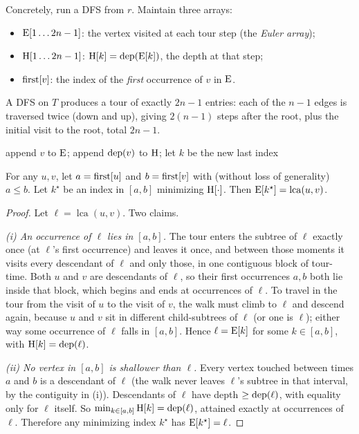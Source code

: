 Concretely, run a DFS from $r$. Maintain three arrays:
\begin{itemize}
\item $\mathrm{E}[1\ldots 2n-1]$: the vertex visited at each tour step (the \emph{Euler array});
\item $\mathrm{H}[1\ldots 2n-1]$: $\mathrm{H}[k]=\operatorname{dep}(\mathrm{E}[k])$, the depth at that step;
\item $\mathrm{first}[v]$: the index of the \emph{first} occurrence of $v$ in $\mathrm{E}$.
\end{itemize}
A DFS on $T$ produces a tour of exactly $2n-1$ entries: each of the $n-1$ edges is traversed
twice (down and up), giving $2(n-1)$ steps after the root, plus the initial visit to the
root, total $2n-1$.

\begin{algorithm}[H]
\DontPrintSemicolon
\caption{\textsc{EulerTour}$(v)$ -- emit into $\eu,\de$ and record $\fst$}
append $v$ to $\mathrm{E}$; append $\operatorname{dep}(v)$ to $\mathrm{H}$; let $k$ be the new last index\;
\end{algorithm}

\begin{theorem}
\label{ch23:thm-euler}
For any $u,v$, let $a=\mathrm{first}[u]$ and $b=\mathrm{first}[v]$ with (without loss of generality) $a\le b$.
Let $k^\star$ be an index in $[a,b]$ minimizing $\mathrm{H}[\cdot]$. Then
$\mathrm{E}[k^\star]=\operatorname{lca}(u,v)$.
\end{theorem}

\begin{proof}
Let $\ell=\operatorname{lca}(u,v)$. Two claims.

\emph{(i) An occurrence of $\ell$ lies in $[a,b]$.} The tour enters the subtree of $\ell$
exactly once (at $\ell$'s first occurrence) and leaves it once, and between those moments it
visits every descendant of $\ell$ and only those, in one contiguous block of tour-time. Both
$u$ and $v$ are descendants of $\ell$, so their first occurrences $a,b$ both lie inside that
block, which begins and ends at occurrences of $\ell$. To travel in the tour from the visit
of $u$ to the visit of $v$, the walk must climb to $\ell$ and descend again, because $u$ and
$v$ sit in different child-subtrees of $\ell$ (or one is $\ell$); either way some occurrence
of $\ell$ falls in $[a,b]$. Hence $\ell=\mathrm{E}[k]$ for some $k\in[a,b]$, with
$\mathrm{H}[k]=\operatorname{dep}(\ell)$.

\emph{(ii) No vertex in $[a,b]$ is shallower than $\ell$.} Every vertex touched between
times $a$ and $b$ is a descendant of $\ell$ (the walk never leaves $\ell$'s subtree in that
interval, by the contiguity in (i)). Descendants of $\ell$ have depth $\ge\operatorname{dep}(\ell)$, with
equality only for $\ell$ itself. So $\min_{k\in[a,b]}\mathrm{H}[k]=\operatorname{dep}(\ell)$, attained exactly at
occurrences of $\ell$. Therefore any minimizing index $k^\star$ has
$\mathrm{E}[k^\star]=\ell$.\qedhere
\end{proof}


